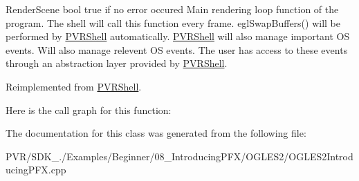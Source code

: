   Render\+Scene  bool true if no error occured  Main rendering loop function of the program. The shell will call this function every frame. egl\+Swap\+Buffers() will be performed by \hyperlink{class_p_v_r_shell}{P\+V\+R\+Shell} automatically. \hyperlink{class_p_v_r_shell}{P\+V\+R\+Shell} will also manage important O\+S events. Will also manage relevent O\+S events. The user has access to these events through an abstraction layer provided by \hyperlink{class_p_v_r_shell}{P\+V\+R\+Shell}. 

Reimplemented from \hyperlink{class_p_v_r_shell_ae0eb5f797cbe993a22b8659f9c332578}{P\+V\+R\+Shell}.



Here is the call graph for this function\+:




The documentation for this class was generated from the following file\+:\begin{DoxyCompactItemize}
\item 
P\+V\+R/\+S\+D\+K\+\_./\+Examples/\+Beginner/08\+\_\+\+Introducing\+P\+F\+X/\+O\+G\+L\+E\+S2/O\+G\+L\+E\+S2\+Introducing\+P\+F\+X.\+cpp\end{DoxyCompactItemize}
